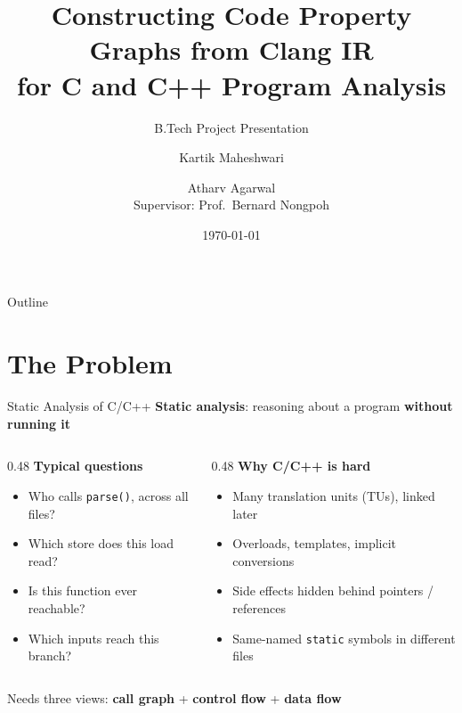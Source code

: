 \documentclass[aspectratio=169,10pt]{beamer}
\title[CPGs from Clang IR]{Constructing Code Property Graphs from Clang IR\\for C and C++ Program Analysis}
\subtitle{B.Tech Project Presentation}
\author[Maheshwari, Agarwal]{Kartik Maheshwari \and Atharv Agarwal \\ \small Supervisor: Prof.~Bernard Nongpoh}
\institute[IIT Guwahati]{Department of Computer Science and Engineering \\ Indian Institute of Technology Guwahati}
\date{\today}
\newcommand{\code}[1]{\texttt{#1}}
\begin{document}
\begin{frame}
  \titlepage
\end{frame}

\begin{frame}{Outline}
  \tableofcontents
\end{frame}

\section{The Problem}

\begin{frame}{Static Analysis of C/C++}
  \textbf{Static analysis}: reasoning about a program \textbf{without running it}

  \vspace{0.8em}
  \begin{columns}[T]
    \begin{column}{0.48\textwidth}
      \textbf{Typical questions}
      \begin{itemize}
        \item Who calls \code{parse()}, across all files?
        \item Which store does this load read?
        \item Is this function ever reachable?
        \item Which inputs reach this branch?
      \end{itemize}
    \end{column}
    \begin{column}{0.48\textwidth}
      \textbf{Why C/C++ is hard}
      \begin{itemize}
        \item Many translation units (TUs), linked later
        \item Overloads, templates, implicit conversions
        \item Side effects hidden behind pointers / references
        \item Same-named \code{static} symbols in different files
      \end{itemize}
    \end{column}
  \end{columns}

  \vspace{1.2em}
  \begin{block}{}
    \centering
    Needs three views: \textbf{call graph} \quad + \quad \textbf{control flow}
    \quad + \quad \textbf{data flow}
  \end{block}
\end{frame}
\end{document}
